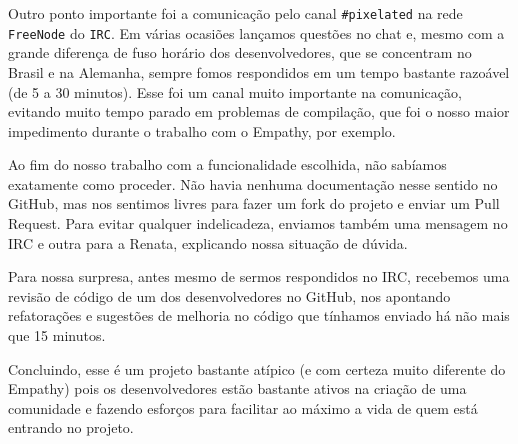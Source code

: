 Outro ponto importante foi a comunicação pelo canal \texttt{\#pixelated} na rede
\texttt{FreeNode} do \texttt{IRC}. Em várias ocasiões lançamos questões no
chat e, mesmo com a grande
diferença de fuso horário dos desenvolvedores, que se concentram no Brasil e na
Alemanha, sempre fomos respondidos em um tempo bastante razoável
(de 5 a 30 minutos). Esse foi um canal muito importante na comunicação, evitando
muito tempo parado em problemas de compilação, que foi o nosso maior impedimento
durante o trabalho com o Empathy, por exemplo.

Ao fim do nosso trabalho com a funcionalidade escolhida, não sabíamos exatamente
como proceder. Não havia nenhuma documentação nesse sentido no GitHub, mas nos
sentimos livres para fazer um fork do projeto e enviar um Pull Request. Para
evitar qualquer indelicadeza, enviamos também uma mensagem no IRC e outra para a
Renata, explicando nossa situação de dúvida.

Para nossa surpresa, antes mesmo de sermos respondidos no IRC, recebemos uma
revisão de código de um dos desenvolvedores no GitHub, nos apontando
refatorações e sugestões de melhoria no código que tínhamos enviado há não mais
que 15 minutos.

Concluindo, esse é um projeto bastante atípico (e com certeza muito diferente
do Empathy) pois os desenvolvedores estão bastante ativos na criação de uma
comunidade e fazendo esforços para facilitar ao máximo a vida de quem está
entrando no projeto.
